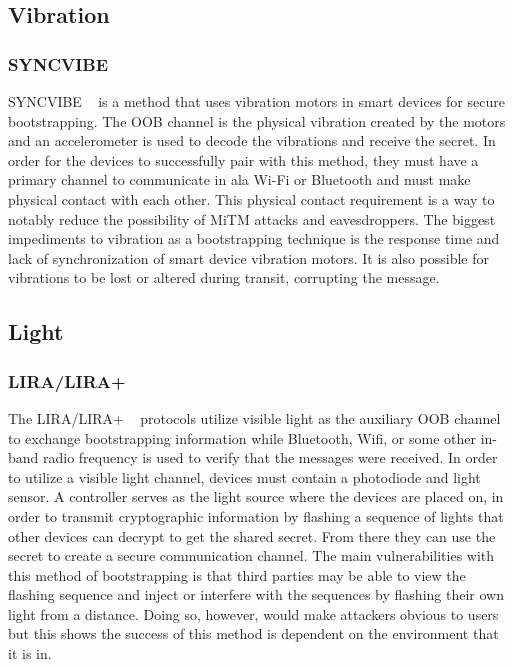 \subsection{Vibration}
\subsubsection{SYNCVIBE}
SYNCVIBE ~\cite{lee2018syncvibe} is a method that uses vibration motors in smart devices for secure bootstrapping. The OOB channel is the physical vibration created by the motors and an accelerometer is used to decode the vibrations and receive the secret. In order for the devices to successfully pair with this method, they must have a primary channel to communicate in ala Wi-Fi or Bluetooth and must make physical contact with each other. This physical contact requirement is a way to notably reduce the possibility of MiTM attacks and eavesdroppers. The biggest impediments to vibration as a bootstrapping technique is the response time and lack of synchronization of smart device vibration motors. It is also possible for vibrations to be lost or altered during transit, corrupting the message.


\subsection{Light}
\subsubsection{LIRA/LIRA+}
The LIRA/LIRA+ ~\cite{kovavcevic2016flashing} protocols utilize visible light as the auxiliary OOB channel to exchange bootstrapping information while Bluetooth, Wifi, or some other in-band radio frequency is used to verify that the messages were received. In order to utilize a visible light channel, devices must contain a photodiode and light sensor. A controller serves as the light source where the devices are placed on, in order to transmit cryptographic information by flashing a sequence of lights that other devices can decrypt to get the shared secret. From there they can use the secret to create a secure communication channel. The main vulnerabilities with this method of bootstrapping is that third parties may be able to view the flashing sequence and inject or interfere with the sequences by flashing their own light from a distance. Doing so, however, would make attackers obvious to users but this shows the success of this method is dependent on the environment that it is in.

